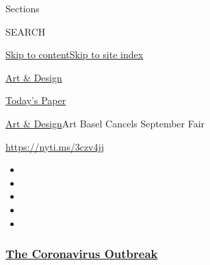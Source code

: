 Sections

SEARCH

\protect\hyperlink{site-content}{Skip to
content}\protect\hyperlink{site-index}{Skip to site index}

\href{https://www.nytimes3xbfgragh.onion/section/arts/design}{Art \&
Design}

\href{https://myaccount.nytimes3xbfgragh.onion/auth/login?response_type=cookie\&client_id=vi}{}

\href{https://www.nytimes3xbfgragh.onion/section/todayspaper}{Today's
Paper}

\href{/section/arts/design}{Art \& Design}\textbar{}Art Basel Cancels
September Fair

\url{https://nyti.ms/3czv4jj}

\begin{itemize}
\item
\item
\item
\item
\item
\end{itemize}

\hypertarget{the-coronavirus-outbreak}{%
\subsubsection{\texorpdfstring{\href{https://www.nytimes3xbfgragh.onion/news-event/coronavirus?name=styln-coronavirus-national\&region=TOP_BANNER\&variant=undefined\&block=storyline_menu_recirc\&action=click\&pgtype=Article\&impression_id=d84450a0-e386-11ea-ba8c-a97e9a30926c}{The
Coronavirus
Outbreak}}{The Coronavirus Outbreak}}\label{the-coronavirus-outbreak}}

